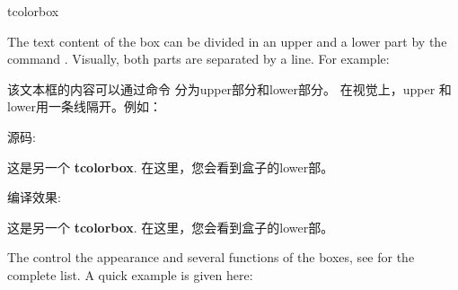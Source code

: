 \begin{docEnvironment}{tcolorbox}{}

The text content of the box can be divided
in an upper and a lower part
by the command . Visually, both parts are separated by a line.
For example:

该文本框的内容可以通过命令  分为upper部分和lower部分。 在视觉上，upper 和 lower用一条线隔开。例如：





\begin{tcolorbox}[title={\tt upper 和 lower用一条线隔开}, before skip=\baselineskip,after skip=\baselineskip,sidebyside]
源码:  
\begin{dispListing}
\begin{tcolorbox}
这是另一个 \textbf{tcolorbox}.
\tcblower
在这里，您会看到盒子的lower部。
\end{tcolorbox}  
\end{dispListing}
\tcblower
编译效果:
\begin{tcolorbox}
这是另一个 \textbf{tcolorbox}.
\tcblower
在这里，您会看到盒子的lower部。
\end{tcolorbox}    
\end{tcolorbox}

\begin{dispExample}
\end{dispExample}

The  control the appearance and several functions of the boxes,
see  for the complete list.
A quick example is given here:


\end{docEnvironment}
